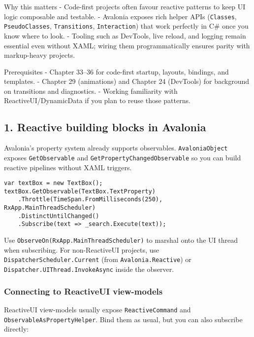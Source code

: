 Why this matters - Code-first projects often favour reactive patterns to
keep UI logic composable and testable. - Avalonia exposes rich helper
APIs (\passthrough{\lstinline!Classes!},
\passthrough{\lstinline!PseudoClasses!},
\passthrough{\lstinline!Transitions!},
\passthrough{\lstinline!Interaction!}) that work perfectly in C\# once
you know where to look. - Tooling such as DevTools, live reload, and
logging remain essential even without XAML; wiring them programmatically
ensures parity with markup-heavy projects.

Prerequisites - Chapter 33--36 for code-first startup, layouts,
bindings, and templates. - Chapter 29 (animations) and Chapter 24
(DevTools) for background on transitions and diagnostics. - Working
familiarity with ReactiveUI/DynamicData if you plan to reuse those
patterns.

\subsection{1. Reactive building blocks in
Avalonia}\label{reactive-building-blocks-in-avalonia}

Avalonia's property system already supports observables.
\passthrough{\lstinline!AvaloniaObject!} exposes
\passthrough{\lstinline!GetObservable!} and
\passthrough{\lstinline!GetPropertyChangedObservable!} so you can build
reactive pipelines without XAML triggers.

\begin{lstlisting}
var textBox = new TextBox();
textBox.GetObservable(TextBox.TextProperty)
    .Throttle(TimeSpan.FromMilliseconds(250), RxApp.MainThreadScheduler)
    .DistinctUntilChanged()
    .Subscribe(text => _search.Execute(text));
\end{lstlisting}

Use \passthrough{\lstinline!ObserveOn(RxApp.MainThreadScheduler)!} to
marshal onto the UI thread when subscribing. For non-ReactiveUI
projects, use \passthrough{\lstinline!DispatcherScheduler.Current!}
(from \passthrough{\lstinline!Avalonia.Reactive!}) or
\passthrough{\lstinline!Dispatcher.UIThread.InvokeAsync!} inside the
observer.

\subsubsection{Connecting to ReactiveUI
view-models}\label{connecting-to-reactiveui-view-models}

ReactiveUI view-models usually expose
\passthrough{\lstinline!ReactiveCommand!} and
\passthrough{\lstinline!ObservableAsPropertyHelper!}. Bind them as
usual, but you can also subscribe directly:

